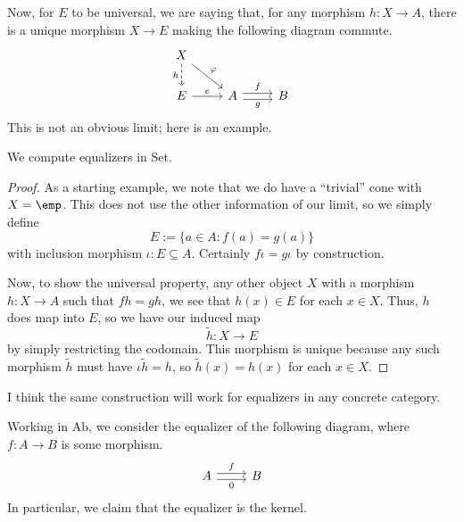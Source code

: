 Now, for $E$ to be universal, we are saying that, for any morphism $h:X\to A$, there is a unique morphism $X\to E$ making the following diagram commute.
\[\begin{tikzcd}
	X \\
	E & A & B
	\arrow["g"', shift right=1, from=2-2, to=2-3]
	\arrow["f", shift left=1, from=2-2, to=2-3]
	\arrow["e", from=2-1, to=2-2]
	\arrow["h"', dashed, from=1-1, to=2-1]
	\arrow["\varphi", from=1-1, to=2-2]
\end{tikzcd}\]
This is not an obvious limit; here is an example.
\begin{exe}
	We compute equalizers in $\mathrm{Set}$.
\end{exe}
\begin{proof}
	As a starting example, we note that we do have a ``trivial'' cone with $X=\emp$. This does not use the other information of our limit, so we simply define
	\[E:=\{a\in A:f(a)=g(a)\}\]
	with inclusion morphism $\iota:E\subseteq A$. Certainly $f\iota=g\iota$ by construction.

	Now, to show the universal property, any other object $X$ with a morphism $h:X\to A$ such that $fh=gh$, we see that $h(x)\in E$ for each $x\in X$. Thus, $h$ does map into $E$, so we have our induced map
	\[\widetilde h:X\to E\]
	by simply restricting the codomain. This morphism is unique because any such morphism $\widetilde h$ must have $\iota\widetilde h=h$, so $\widetilde h(x)=h(x)$ for each $x\in X$.
\end{proof}
\begin{remark}
	I think the same construction will work for equalizers in any concrete category.
\end{remark}
\begin{exe}
	Working in $\mathrm{Ab}$, we consider the equalizer of the following diagram, where $f:A\to B$ is some morphism.
	\[\begin{tikzcd}
		A & B
		\arrow["0"', shift right=1, from=1-1, to=1-2]
		\arrow["f", shift left=1, from=1-1, to=1-2]
	\end{tikzcd}\]
	In particular, we claim that the equalizer is the kernel.
\end{exe}
